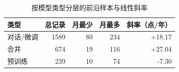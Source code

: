 \begin{table}[!htbp]
\centering
\songti{}
\setlength{\tabcolsep}{4pt}
\caption{按模型类型分层的前沿样本与线性斜率}
\label{tab:q4-type-frontiers}
\begin{tabular}{lrrrr}
\toprule
类型 & 总记录 & 月最少 & 月最多 & 斜率（点/年） \\
\midrule
对话/微调 & 1589 & 80 & 234 & +18.17 \\
合并 & 674 & 19 & 116 & +27.04 \\
预训练 & 239 & 10 & 74 & -7.30 \\
\bottomrule
\end{tabular}
\end{table}
